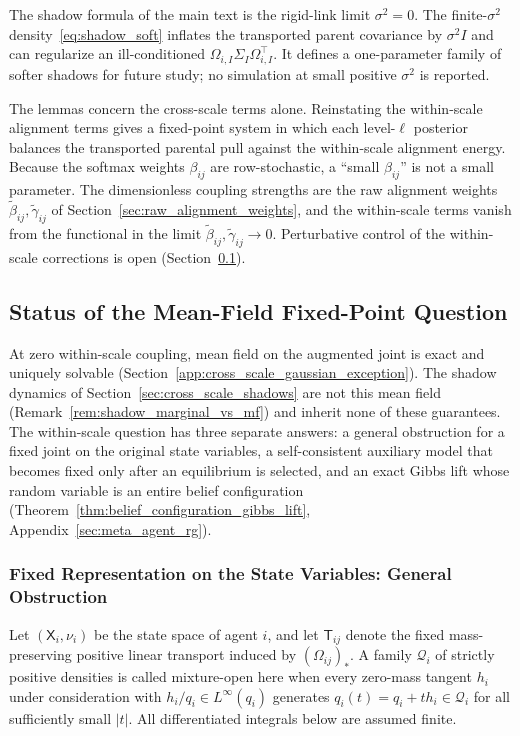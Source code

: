 The shadow formula of the main text is the rigid-link limit $\sigma^2 = 0$. The finite-$\sigma^2$ density~\eqref{eq:shadow_soft} inflates the transported parent covariance by $\sigma^2 I$ and can regularize an ill-conditioned $\Omega_{i,I}\Sigma_I\Omega_{i,I}^\top$. It defines a one-parameter family of softer shadows for future study; no simulation at small positive $\sigma^2$ is reported.

The lemmas concern the cross-scale terms alone. Reinstating the within-scale alignment terms gives a fixed-point system in which each level-$\ell$ posterior balances the transported parental pull against the within-scale alignment energy. Because the softmax weights $\beta_{ij}$ are row-stochastic, a ``small $\beta_{ij}$'' is not a small parameter. The dimensionless coupling strengths are the raw alignment weights $\tilde\beta_{ij}, \tilde\gamma_{ij}$ of Section~\ref{sec:raw_alignment_weights}, and the within-scale terms vanish from the functional in the limit $\tilde\beta_{ij}, \tilde\gamma_{ij} \to 0$. Perturbative control of the within-scale corrections is open (Section~\ref{app:mf_fixedpoint_status}).

\subsection{Status of the Mean-Field Fixed-Point Question}
\label{app:mf_fixedpoint_status}

At zero within-scale coupling, mean field on the augmented joint is exact and uniquely solvable (Section~\ref{app:cross_scale_gaussian_exception}). The shadow dynamics of Section~\ref{sec:cross_scale_shadows} are not this mean field (Remark~\ref{rem:shadow_marginal_vs_mf}) and inherit none of these guarantees. The within-scale question has three separate answers: a general obstruction for a fixed joint on the original state variables, a self-consistent auxiliary model that becomes fixed only after an equilibrium is selected, and an exact Gibbs lift whose random variable is an entire belief configuration (Theorem~\ref{thm:belief_configuration_gibbs_lift}, Appendix~\ref{sec:meta_agent_rg}).

\subsubsection{Fixed Representation on the State Variables: General Obstruction}

Let $(\mathsf{X}_i,\nu_i)$ be the state space of agent $i$, and let $\mathsf{T}_{ij}$ denote the fixed mass-preserving positive linear transport induced by $(\Omega_{ij})_*$. A family $\mathcal{Q}_i$ of strictly positive densities is called mixture-open here when every zero-mass tangent $h_i$ under consideration with $h_i/q_i\in L^\infty(q_i)$ generates $q_i(t)=q_i+t h_i\in\mathcal{Q}_i$ for all sufficiently small $|t|$. All differentiated integrals below are assumed finite.

